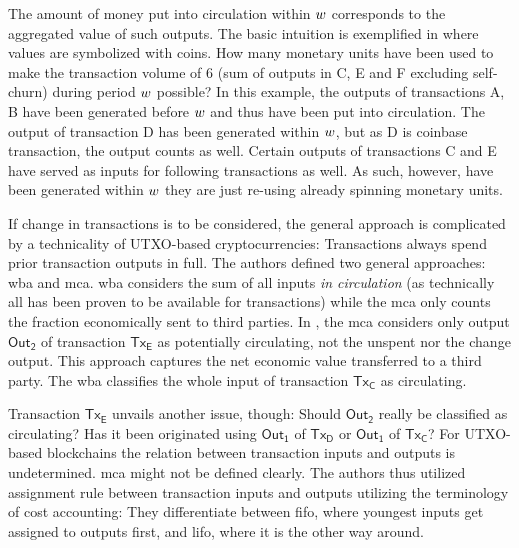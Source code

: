 The amount of money put into circulation within \({w}\) corresponds to the aggregated value of such outputs. %
%
The basic intuition is exemplified in  where values are symbolized with coins. %
How many monetary units have been used to make the transaction volume of $6$ (sum of outputs in C, E and F excluding self-churn) during period ${w}$ possible? %
In this example, the outputs of transactions A, B have been generated before \({w}\) and thus have been put into circulation. %
The output of transaction D has been generated within \({w}\), but as D is coinbase transaction, the output counts as well. %
Certain outputs of transactions C and E have served as inputs for following transactions as well. %
As such, however, have been generated within \({w}\) they are just re-using already spinning monetary units. %

If change in transactions is to be considered, the general approach is complicated by a technicality of UTXO-based cryptocurrencies: Transactions always spend prior transaction outputs in full. %
The authors defined two general approaches: \ac{wba} and \ac{mca}.  %
\ac{wba} considers the sum of all inputs \textit{in circulation} (as technically all has been proven to be available for transactions) while the \ac{mca} only counts the fraction economically sent to third parties.  %
%
In , the \ac{mca} considers only output $\mathsf{Out_2}$ of transaction $\mathsf{Tx_E}$ as potentially circulating, not the unspent nor the change output.  %
This approach captures the net economic value transferred to a third party.  %
The \ac{wba} classifies the whole input of transaction $\mathsf{Tx_C}$ as circulating.  %

Transaction $\mathsf{Tx_E}$ unvails another issue, though: Should $\mathsf{Out_2}$ really be classified as circulating? %
Has it been originated using $\mathsf{Out_1}$ of $\mathsf{Tx_D}$ or $\mathsf{Out_1}$ of $\mathsf{Tx_C}$? 
For UTXO-based blockchains the relation between transaction inputs and outputs is undetermined. %
\ac{mca} might not be defined clearly. %
The authors thus utilized assignment rule between transaction inputs and outputs utilizing the terminology of cost accounting: %
They differentiate between \ac{fifo}, where youngest inputs get assigned to outputs first, and \ac{lifo}, where it is the other way around.  %


